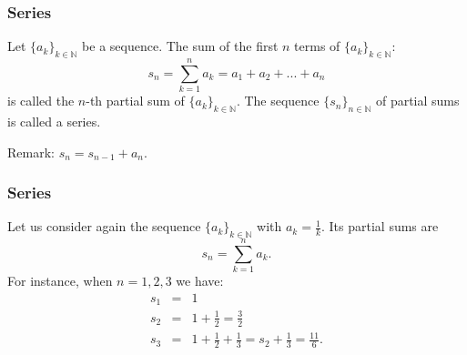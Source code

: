 \documentclass[notes=show,smaller,handout]{beamer}
\begin{document}
\begin{frame}

\frametitle{Series }


\begin{definition}
Let $\{ a_k \}_{k \in \mathbb{N}}$ be a  sequence. The sum of the first $n$ terms of  $\{ a_k \}_{k \in \mathbb{N}}$:
$$
s_n = \sum_{k=1}^{n} a_k = a_1 + a_2 +...+a_n
$$
is called the $n$-th partial sum of $\{ a_k \}_{k \in \mathbb{N}}$. The sequence $\{s_n\}_{n \in \mathbb{N}}$ of partial sums
is called a series. 

\end{definition}

\vspace{0.4cm} 

Remark: $s_n = s_{n-1} + a_n$.


\end{frame}%


\begin{frame}

\frametitle{Series }


\begin{example}
Let us consider again the sequence $\{ a_k \}_{k \in \mathbb{N}}$ with $a_k = \frac{1}{k}$. Its partial sums are 
$$
s_n =  \sum_{k=1}^{n} a_k.
$$
For instance, when $n=1,2,3$ we have:
\begin{eqnarray*}
s_1 &=& 1 \\
s_2 &=& 1 + \frac{1}{2} = \frac{3}{2}  \\
s_3 &=& 1 + \frac{1}{2} + \frac{1}{3} = s_2 + \frac{1}{3} = \frac{11}{6}.
\end{eqnarray*}


\end{example}

\end{frame}%
\end{document}
